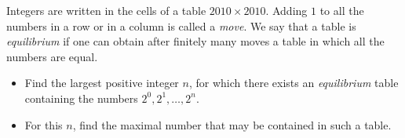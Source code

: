 Integers are written in the cells of a table $2010 \times 2010$. Adding $1$ to all the numbers in a row or in a column is called a \textit{move}. We say that a table is \textit{equilibrium} if one can obtain after finitely many moves a table in which all the numbers are equal.
\begin{itemize}
	\item Find the largest positive integer $n$, for which there exists an \textit{equilibrium} table containing the numbers $2^0, 2^1, \ldots , 2^n$.
	\item For this $n$, find the maximal number that may be contained in such a table.
\end{itemize}
